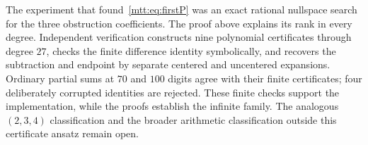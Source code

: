 The experiment that found~\eqref{mtt:eq:firstP} was an exact rational
nullspace search for the three obstruction coefficients. The proof above
explains its rank in every degree. Independent verification constructs
nine polynomial certificates through degree $27$, checks the finite
difference identity symbolically, and recovers the subtraction and
endpoint by separate centered and uncentered expansions. Ordinary partial
sums at $70$ and $100$ digits agree with their finite certificates; four
deliberately corrupted identities are rejected. These finite checks
support the implementation, while the proofs establish the infinite
family. The analogous $(2,3,4)$ classification and the broader arithmetic
classification outside this certificate ansatz remain open.
